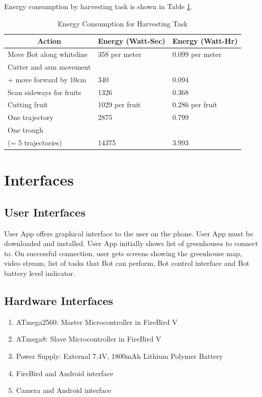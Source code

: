 \documentclass[a4paper, 12pt]{article}
\begin{document}
 Energy consumption by harvesting task is shown in Table \ref{table-energy}.
 \begin{table}
  \centering
  \begin{tabular}{|l|l|l|}
 \hline
 \multicolumn{1}{|c|}{\textbf{Action}} & \multicolumn{1}{|c|}{\textbf{Energy (Watt-Sec)}} & 
 \multicolumn{1}{|c|}{\textbf{Energy (Watt-Hr)}}\\
 \hline
 \hline
 Move Bot along whiteline & 358 per meter & 0.099 per meter\\
 \hline
 Cutter and arm movement & &\\
 + move forward by 10cm & 340 & 0.094\\
 \hline
 Scan sideways for fruits & 1326 & 0.368\\
 \hline
 Cutting fruit & 1029 per fruit & 0.286 per fruit\\
 \hline
 One trajectory & 2875 & 0.799\\
 \hline
 One trough & &  \\
 (= 5 trajectories)& 14375 & 3.993\\
 \hline
 \end{tabular}
 \caption{Energy Consumption for Harvesting Task}
 \label{table-energy}
 \end{table}
 
\section{Interfaces}
\subsection{User Interfaces}
User App offers graphical interface to the user on the phone. User App must be downloaded and installed.
User App initially shows list of greenhouses to connect to. On successful connection, user gets screens showing
the greenhouse map, video stream, list of tasks that Bot can perform, Bot control interface and Bot battery level
indicator.

\subsection{Hardware Interfaces}
\begin{enumerate}
 \item ATmega2560: Master Microcontroller in FireBird V
 \item ATmega8: Slave Microcontroller in FireBird V
 \item Power Supply: External 7.4V, 1800mAh Lithium Polymer Battery
 \item FireBird and Android interface
 \item Camera and Android interface
\end{enumerate}
\end{document}
